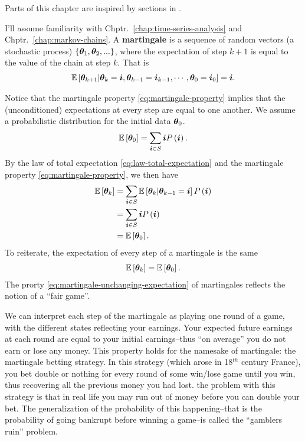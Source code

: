 Parts of this chapter are inspired by sections in \cite{zhou2008practical,feller1968introduction}.

I'll assume familiarity with Chptr.~\ref{chap:time-series-analysis} and Chptr.~\ref{chap:markov-chains}.
A \textbf{martingale} is a sequence of random vectors (a stochastic process) $\left\{{\bm \theta}_1,{\bm \theta}_2,...\right\}$, where the expectation of step $k+1$ is equal to the value of the chain at step $k$.
That is
\begin{align}
    \label{eq:martingale-property}
    \mathbb{E}\left[{\bm \theta}_{k+1}|{\bm \theta}_{k}={\bm i},{\bm \theta}_{k-1}={\bm i}_{k-1},\cdots,{\bm \theta}_0={\bm i}_0\right]
    =
    {\bm i}
    .
\end{align}

Notice that the martingale property \eqref{eq:martingale-property} implies that the (unconditioned) expectations at every step are equal to one another.
We assume a probabilistic distribution for the initial data ${\bm \theta}_0$.
\begin{align}
    \mathbb{E}\left[{\bm \theta}_0\right]
    =
    \sum_{{\bm i}\in S} {\bm i} P\left({\bm i}\right)
    .
\end{align}
By the law of total expectation \eqref{eq:law-total-expectation} and the martingale property \eqref{eq:martingale-property}, we then have
\begin{align}
    \mathbb{E}\left[{\bm \theta}_k\right]
    &=
    \sum_{{\bm i}\in S} \mathbb{E}\left[{\bm \theta}_k|{\bm \theta}_{k-1}={\bm i}\right]P\left({\bm i}\right)
    \nonumber\\
    &=
    \sum_{{\bm i}\in S} {\bm i} P\left({\bm i}\right)
    \nonumber\\
    &=
    \mathbb{E}\left[{\bm \theta}_0\right]
    .
\end{align}
To reiterate, the expectation of every step of a martingale is the same 
\begin{align}
    \label{eq:martingale-unchanging-expectation}
    \mathbb{E}\left[{\bm \theta}_k\right]
    =
    \mathbb{E}\left[{\bm \theta}_0\right]
    .
\end{align}
The prorty \eqref{eq:martingale-unchanging-expectation} of martingales reflects the notion of a ``fair game''.

We can interpret each step of the martingale as playing one round of a game, with the different states reflecting your earnings.
Your expected future earnings at each round are equal to your initial earnings--thus ``on average'' you do not earn or lose any money. 
This property holds for the namesake of martingale: the martingale betting strategy.
In this strategy (which arose in 18$^{th}$ century France), you bet double or nothing for every round of some win/lose game until you win, thus recovering all the previous money you had lost. 
the problem with this strategy is that in real life you may run out of money before you can double your bet.
The generalization of the probability of this happening--that is the probability of going bankrupt before winning a game--is called the ``gamblers ruin'' problem.

